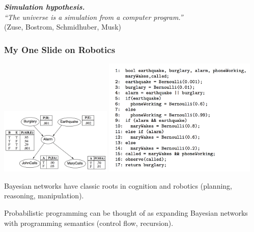 \documentclass[10pt,
               xcolor={usenames,dvipsnames},
               hyperref={colorlinks,linktoc=all,citecolor=Plum,linkcolor=MidnightBlue,urlcolor=MidnightBlue},noamssymb]{beamer}
\begin{document}
\begin{frame}
\begin{center}
{\Huge
\textit{\textbf{Simulation hypothesis.} \\
``The universe is a simulation from a computer program.''
}
\\[2ex]
{\Large
(Zuse, Bostrom, Schmidhuber, Musk)
}}
\end{center}
\end{frame}

\begin{frame}[plain]
\frametitle{My One Slide on Robotics}
\begin{center}
\includegraphics[width=0.40\textwidth]{img/earthquake-graph.png}
\hfill
\includegraphics[width=0.55\textwidth]{img/earthquake-program.png}
\\[0.5cm]
\end{center}

Bayesian networks have classic roots in cognition and robotics
(planning, reasoning, manipulation).

Probabilistic programming can be thought of as expanding Bayesian
networks with programming semantics (control flow, recursion).
\\
\end{frame}
\end{document}
